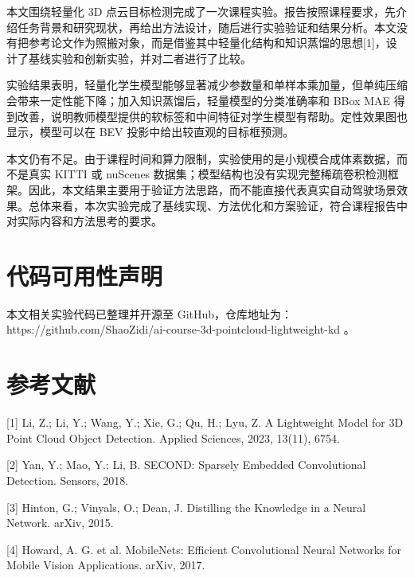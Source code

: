 \documentclass[UTF8]{ctexart}
\begin{document}
本文围绕轻量化 3D 点云目标检测完成了一次课程实验。报告按照课程要求，先介绍任务背景和研究现状，再给出方法设计，随后进行实验验证和结果分析。本文没有把参考论文作为照搬对象，而是借鉴其中轻量化结构和知识蒸馏的思想[1]，设计了基线实验和创新实验，并对二者进行了比较。


实验结果表明，轻量化学生模型能够显著减少参数量和单样本乘加量，但单纯压缩会带来一定性能下降；加入知识蒸馏后，轻量模型的分类准确率和 BBox MAE 得到改善，说明教师模型提供的软标签和中间特征对学生模型有帮助。定性效果图也显示，模型可以在 BEV 投影中给出较直观的目标框预测。


本文仍有不足。由于课程时间和算力限制，实验使用的是小规模合成体素数据，而不是真实 KITTI 或 nuScenes 数据集；模型结构也没有实现完整稀疏卷积检测框架。因此，本文结果主要用于验证方法思路，而不能直接代表真实自动驾驶场景效果。总体来看，本次实验完成了基线实现、方法优化和方案验证，符合课程报告中对实际内容和方法思考的要求。


\section{代码可用性声明}

本文相关实验代码已整理并开源至 GitHub，仓库地址为：https://github.com/ShaoZidi/ai-course-3d-pointcloud-lightweight-kd 。


\section{参考文献}

[1] Li, Z.; Li, Y.; Wang, Y.; Xie, G.; Qu, H.; Lyu, Z. A Lightweight Model for 3D Point Cloud Object Detection. Applied Sciences, 2023, 13(11), 6754.


[2] Yan, Y.; Mao, Y.; Li, B. SECOND: Sparsely Embedded Convolutional Detection. Sensors, 2018.


[3] Hinton, G.; Vinyals, O.; Dean, J. Distilling the Knowledge in a Neural Network. arXiv, 2015.


[4] Howard, A. G. et al. MobileNets: Efficient Convolutional Neural Networks for Mobile Vision Applications. arXiv, 2017.
\end{document}
